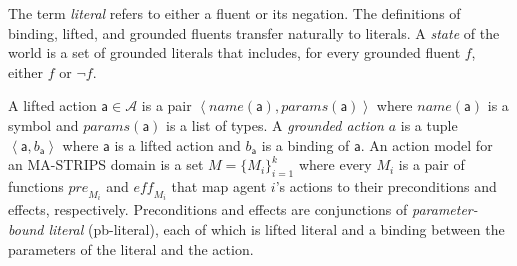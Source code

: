 \documentclass[letterpaper]{article} %
\newcommand{\pre}{\textit{pre}}
\newcommand{\eff}{\textit{eff}}
\theoremstyle{definition}
\theoremstyle{remark}
\newcommand{\tuple}[1]{\ensuremath{\left \langle #1 \right \rangle }}
\newcommand{\params}{\textit{params}}
\newcommand{\name}{\textit{name}}
\newcommand{\liftf}{\mathsf{f}}
\newcommand{\lifta}{\mathsf{a}}
\newcommand{\pbl}{pb-literal\xspace}
\newcommand{\roni}[1]{{\textcolor{red}{[Roni: #1]}}}
\begin{document}
The term \emph{literal} refers to either a fluent or its negation.
The definitions of binding, lifted, and grounded fluents transfer naturally to literals.
A \emph{state} of the world is a set of grounded literals that includes, for every grounded fluent $f$, either $f$ or $\neg f$.


A lifted action $\lifta\in \mathcal{A}$ is a pair $\tuple{\name(\lifta), \params(\lifta)}$
where $\name(\lifta)$ is a symbol and $\params(\lifta)$ is a list of types.
A \emph{grounded action} $a$ is a tuple $\tuple{\lifta, b_\lifta}$ where $\lifta$ is a lifted action and $b_\lifta$ is a binding of $\lifta$.
An action model for an MA-STRIPS domain is a set $M=\{M_i\}_{i=1}^k$ where every $M_i$ is a pair of functions $\pre_{M_i}$ and $\eff_{M_i}$ that map agent $i$'s actions to their preconditions and effects, respectively. %
Preconditions and effects are conjunctions of \emph{parameter-bound literal} (\pbl), each of which is lifted literal and a binding between the parameters of the literal and the action. %
\end{document}
